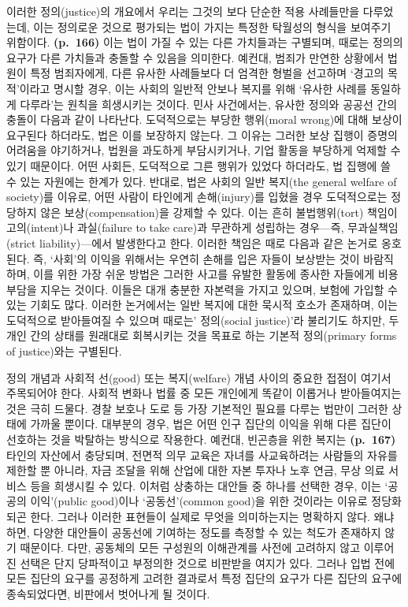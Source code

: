 이러한 정의(justice)의 개요에서 우리는 그것의 보다 단순한 적용
사례들만을 다루었는데, 이는 정의로운 것으로 평가되는 법이 가지는 특정한
탁월성의 형식을 보여주기 위함이다. \textbf{(p.~166)} 이는 법이 가질 수
있는 다른 가치들과는 구별되며, 때로는 정의의 요구가 다른 가치들과 충돌할
수 있음을 의미한다. 예컨대, 범죄가 만연한 상황에서 법원이 특정
범죄자에게, 다른 유사한 사례들보다 더 엄격한 형벌을 선고하며 `경고의
목적'이라고 명시할 경우, 이는 사회의 일반적 안보나 복지를 위해 `유사한
사례를 동일하게 다루라'는 원칙을 희생시키는 것이다. 민사 사건에서는,
유사한 정의와 공공선 간의 충돌이 다음과 같이 나타난다. 도덕적으로는
부당한 행위(moral wrong)에 대해 보상이 요구된다 하더라도, 법은 이를
보장하지 않는다. 그 이유는 그러한 보상 집행이 증명의 어려움을
야기하거나, 법원을 과도하게 부담시키거나, 기업 활동을 부당하게 억제할 수
있기 때문이다. 어떤 사회든, 도덕적으로 그른 행위가 있었다 하더라도, 법
집행에 쓸 수 있는 자원에는 한계가 있다. 반대로, 법은 사회의 일반
복지(the general welfare of society)를 이유로, 어떤 사람이 타인에게
손해(injury)를 입혔을 경우 도덕적으로는 정당하지 않은
보상(compensation)을 강제할 수 있다. 이는 흔히 불법행위(tort) 책임이
고의(intent)나 과실(failure to take care)과 무관하게 성립하는 경우---즉,
무과실책임(strict liability)---에서 발생한다고 한다. 이러한 책임은 때로
다음과 같은 논거로 옹호된다. 즉, `사회'의 이익을 위해서는 우연히 손해를
입은 자들이 보상받는 것이 바람직하며, 이를 위한 가장 쉬운 방법은 그러한
사고를 유발한 활동에 종사한 자들에게 비용 부담을 지우는 것이다. 이들은
대개 충분한 자본력을 가지고 있으며, 보험에 가입할 수 있는 기회도 많다.
이러한 논거에서는 일반 복지에 대한 묵시적 호소가 존재하며, 이는
도덕적으로 받아들여질 수 있으며 때로는' 정의(social
justice)'라 불리기도 하지만, 두 개인 간의 상태를 원래대로 회복시키는
것을 목표로 하는 기본적 정의(primary forms of justice)와는 구별된다.

정의 개념과 사회적 선(good) 또는 복지(welfare) 개념 사이의 중요한 접점이
여기서 주목되어야 한다. 사회적 변화나 법률 중 모든 개인에게 똑같이
이롭거나 받아들여지는 것은 극히 드물다. 경찰 보호나 도로 등 가장
기본적인 필요를 다루는 법만이 그러한 상태에 가까울 뿐이다. 대부분의
경우, 법은 어떤 인구 집단의 이익을 위해 다른 집단이 선호하는 것을
박탈하는 방식으로 작용한다. 예컨대, 빈곤층을 위한 복지는
\textbf{(p.~167)} 타인의 자산에서 충당되며, 전면적 의무 교육은 자녀를
사교육하려는 사람들의 자유를 제한할 뿐 아니라, 자금 조달을 위해 산업에
대한 자본 투자나 노후 연금, 무상 의료 서비스 등을 희생시킬 수 있다.
이처럼 상충하는 대안들 중 하나를 선택한 경우, 이는 `공공의 이익'(public
good)이나 `공동선'(common good)을 위한 것이라는 이유로 정당화되곤 한다.
그러나 이러한 표현들이 실제로 무엇을 의미하는지는 명확하지 않다.
왜냐하면, 다양한 대안들이 공동선에 기여하는 정도를 측정할 수 있는 척도가
존재하지 않기 때문이다. 다만, 공동체의 모든 구성원의 이해관계를 사전에
고려하지 않고 이루어진 선택은 단지 당파적이고 부정의한 것으로 비판받을
여지가 있다. 그러나 입법 전에 모든 집단의 요구를 공정하게 고려한
결과로서 특정 집단의 요구가 다른 집단의 요구에 종속되었다면,
 비판에서 벗어나게 될 것이다.

